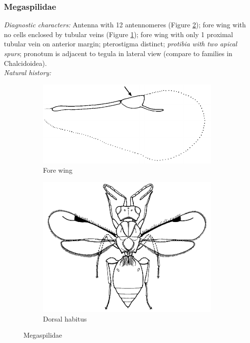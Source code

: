 \documentclass[letterpaper, 11pt]{article}
\begin{document}
\subsubsection{Megaspilidae}
\noindent{}\textit{Diagnostic characters:} Antenna with 12 antennomeres (Figure \ref{fig:megaspilid2}); fore wing with no cells enclosed by tubular veins (Figure \ref{fig:megaspilid1}); fore wing with only 1 proximal tubular vein on anterior margin; pterostigma distinct; \textit{protibia with two apical spurs}; pronotum is adjacent to tegula in lateral view (compare to families in Chalcidoidea).\\

\noindent{}\textit{Natural history:} \\

\begin{figure}[ht!]
  \centering
\begin{subfigure}[ht!]{0.45\textwidth}
    \includegraphics[width=\textwidth]{MegaspilidWing}
  \caption{Fore wing \citep[][pg. 566]{goulet1993hymenoptera}}
  \label{fig:megaspilid1}
\end{subfigure}
    \hfill
\begin{subfigure}[ht!]{0.45\textwidth}
    \includegraphics[width=\textwidth]{MegaspilidHabitus}
  \caption{Dorsal habitus \citep[][Fig. 209]{goulet1993hymenoptera}}
  \label{fig:megaspilid2}
\end{subfigure}
    \caption{Megaspilidae}\label{fig:megaspilid}
\end{figure}
\end{document}
